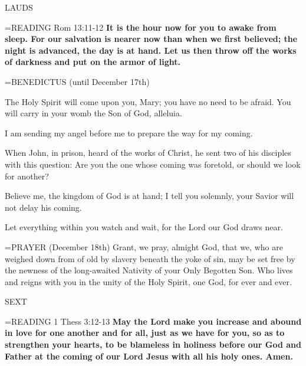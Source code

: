 \begin{flushleft}\normalsize LAUDS\\\end{flushleft}

\hangindent=\parindent \small{\uppercase{READING}} Rom 13:11-12 \textbf{ It is the hour now for you to awake from sleep. For our salvation is nearer now than when we first believed; the night is advanced, the day is at hand. Let us then throw off the works of darkness and put on the armor of light.\\}

\hangindent=\parindent \small BENEDICTUS (until December 17th)
\begin{description}[labelindent=\parindent, leftmargin=*]
\item [Week 1:]  The Holy Spirit will come upon you, Mary; you have no need to be afraid. You will carry in your womb the Son of God, alleluia.
\item [Week 2:]  I am sending my angel before me to prepare the way for my coming.
\item [Week 3:]  When John, in prison, heard of the works of Christ, he sent two of his disciples with this question: Are you the one whose coming was foretold, or should we look for another?
\item [(December 17th):]  Believe me, the kingdom of God is at hand; I tell you solemnly, your Savior will not delay his coming.
\item [(December 18th):]  Let everything within you watch and wait, for the Lord our God draws near.
\end{description}

\hangindent=\parindent \small{PRAYER  (December 18th) Grant, we pray, almight God, that we, who are weighed down from of old by slavery beneath the yoke of sin, may be set free by the newness of the long-awaited Nativity of your Only Begotten Son. Who lives and reigns with you in the unity of the Holy Spirit, one God, for ever and ever.}

\begin{flushleft}\normalsize SEXT\\\end{flushleft}

\hangindent=\parindent \small{\uppercase{READING}} 1 Thess 3:12-13 \textbf{May the Lord make you increase and abound in love for one another and for all, just as we have for you, so as to strengthen your hearts, to be blameless in holiness before our God and Father at the coming of our Lord Jesus with all his holy ones. Amen.\\}

